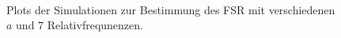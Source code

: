 \begin{figure}[H]
{{{		}\\
	}}
	\caption[Simulationen Nonius-Methode]{Plots der
	Simulationen zur Bestimmung des FSR mit verschiedenen $a$ und $7$
	Relativfrequnenzen.}
	\label{fig:nonius_FSR_simulation}
\end{figure}
